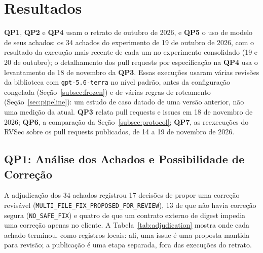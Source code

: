 \documentclass[conference]{IEEEtran}
\newcommand{\researchq}[1]{\textbf{QP#1}}
\begin{document}
\section{Resultados}
\label{sec:results}

\researchq{1}, \researchq{2} e \researchq{4} usam o retrato de outubro de
2026, e \researchq{5} o uso de modelo de seus achados: os 34 achados
do experimento de 19 de outubro de 2026, com o resultado da execução mais
recente de cada um no experimento consolidado (19 e 20 de outubro); o
detalhamento dos pull requests por especificação na \researchq{4} usa o
levantamento de 18 de novembro da \researchq{3}. Essas execuções usaram várias
revisões da biblioteca com \texttt{gpt-5.6-terra} no nível padrão, antes da
configuração congelada (Seção~\ref{subsec:frozen}) e de várias regras de roteamento
(Seção~\ref{sec:pipeline}): um estudo de caso datado de uma versão anterior, não uma
medição da atual. \researchq{3} relata pull requests e issues
em 18 de novembro de 2026; \researchq{6}, a comparação da
Seção~\ref{subsec:protocol}; \researchq{7}, as reexecuções do RVSec sobre os pull
requests publicados, de 14 a 19 de novembro de 2026.

\subsection{\researchq{1}: Análise dos Achados e Possibilidade de Correção}
\label{subsec:rq1}

A adjudicação dos 34 achados registrou 17 decisões de propor uma correção
revisável (\texttt{MULTI\_FILE\_FIX\_PROPOSED\_FOR\_REVIEW}), 13 de que não
havia correção segura (\texttt{NO\_SAFE\_FIX}) e quatro de que um contrato
externo de digest impedia uma correção apenas no cliente. A Tabela~\ref{tab:adjudication} mostra
onde cada achado terminou, como registros locais: ali, uma issue é uma proposta mantida
para revisão; a publicação é uma etapa separada, fora das execuções do retrato.
\end{document}
